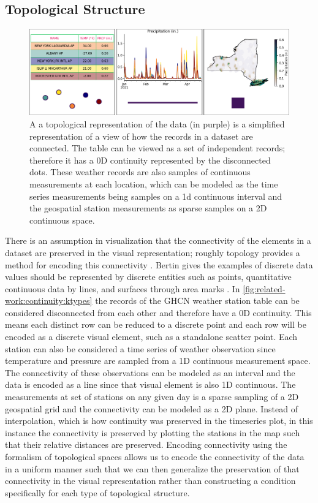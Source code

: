 \documentclass[10pt,journal,compsoc]{IEEEtran}
\theoremstyle{definition}
\theoremstyle{remark}
\begin{document}
\subsection{Topological Structure}
\label{sec:related-work:continuity}
\begin{figure}[h!]
  \includegraphics[width=1\columnwidth]{k_different_types.png}
  \caption{
  A a topological representation of the data (in purple) is a simplified representation of a view of how the records in a dataset are connected. The table can be viewed as a set of independent records; therefore it has a 0D continuity represented by the disconnected dots. These weather records are also samples of continuous measurements at each location, which can be modeled as the time series measurements being samples on a 1d continuous interval and the geospatial station measurements as sparse samples on a 2D continuous space. 
  \label{fig:related-work:continuity:ktypes}}
\end{figure}

There is an assumption in visualization that the connectivity of the elements in a dataset are preserved in the visual representation; roughly topology provides a method for encoding this connectivity \cite{wilkinsonGrammarGraphics2005}. Bertin gives the examples of discrete data values should be represented by discrete entities such as points, quantitative continuous data by lines, and surfaces through area marks \cite{bertinSemiologyGraphicsDiagrams2011}. In \autoref{fig:related-work:continuity:ktypes} the records of the GHCN\cite{lawrimoreGlobalHistoricalClimatology2011} weather station table can be considered disconnected from each other and therefore have a 0D continuity. This means each distinct row can be reduced to a discrete point and each row will be encoded as a discrete visual element, such as a standalone scatter point. Each station can also be considered a time series of weather observation since temperature and pressure are sampled from a 1D continuous measurement space. The connectivity of these observations can be modeled as an interval and the data is encoded as a line since that visual element is also 1D continuous. The measurements at set of stations on any given day is a sparse sampling of a 2D geospatial grid and the connectivity can be modeled as a 2D plane. Instead of interpolation, which is how continuity was preserved in the timeseries plot, in this instance the connectivity is preserved by plotting the stations in the map such that their relative distances are preserved. Encoding connectivity using the formalism of topological spaces allows us to encode the connectivity of the data in a uniform manner such that we can then generalize the preservation of that connectivity in the visual representation rather than constructing a condition specifically for each type of topological structure. 
\end{document}
